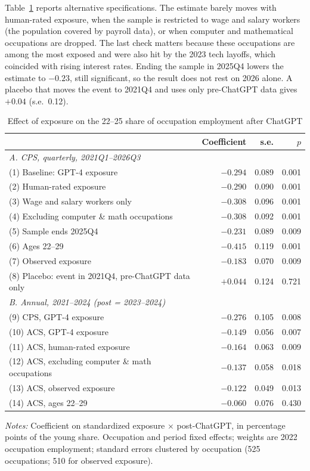 \documentclass[11pt]{article}
\begin{document}
Table~\ref{tab:main} reports alternative specifications. The estimate barely moves with human-rated exposure, when the sample is restricted to wage and salary workers (the population covered by payroll data), or when computer and mathematical occupations are dropped. The last check matters because these occupations are among the most exposed and were also hit by the 2023 tech layoffs, which coincided with rising interest rates. Ending the sample in 2025Q4 lowers the estimate to $-0.23$, still significant, so the result does not rest on 2026 alone. A placebo that moves the event to 2021Q4 and uses only pre-ChatGPT data gives $+0.04$ (s.e.\ 0.12).

\begin{table}[!htbp]
\centering
\footnotesize
\caption{Effect of exposure on the 22--25 share of occupation employment after ChatGPT}
\label{tab:main}
\begin{tabular}{lrrr}
\toprule
 & Coefficient & s.e. & $p$ \\
\midrule
\multicolumn{4}{l}{\textit{A. CPS, quarterly, 2021Q1--2026Q3}} \\
(1) Baseline: GPT-4 exposure & $-0.294$ & 0.089 & 0.001 \\
(2) Human-rated exposure & $-0.290$ & 0.090 & 0.001 \\
(3) Wage and salary workers only & $-0.308$ & 0.096 & 0.001 \\
(4) Excluding computer \& math occupations & $-0.308$ & 0.092 & 0.001 \\
(5) Sample ends 2025Q4 & $-0.231$ & 0.089 & 0.009 \\
(6) Ages 22--29 & $-0.415$ & 0.119 & 0.001 \\
(7) Observed exposure \citep{massenkoff2026} & $-0.183$ & 0.070 & 0.009 \\
(8) Placebo: event in 2021Q4, pre-ChatGPT data only & $+0.044$ & 0.124 & 0.721 \\
\midrule
\multicolumn{4}{l}{\textit{B. Annual, 2021--2024 (post = 2023--2024)}} \\
(9) CPS, GPT-4 exposure & $-0.276$ & 0.105 & 0.008 \\
(10) ACS, GPT-4 exposure & $-0.149$ & 0.056 & 0.007 \\
(11) ACS, human-rated exposure & $-0.164$ & 0.063 & 0.009 \\
(12) ACS, excluding computer \& math occupations & $-0.137$ & 0.058 & 0.018 \\
(13) ACS, observed exposure & $-0.122$ & 0.049 & 0.013 \\
(14) ACS, ages 22--29 & $-0.060$ & 0.076 & 0.430 \\
\bottomrule
\end{tabular}
\par\vspace{4pt}
\begin{minipage}{0.92\textwidth}
\footnotesize \textit{Notes:} Coefficient on standardized exposure $\times$ post-ChatGPT, in percentage points of the young share. Occupation and period fixed effects; weights are 2022 occupation employment; standard errors clustered by occupation (525 occupations; 510 for observed exposure).
\end{minipage}
\end{table}
\end{document}
